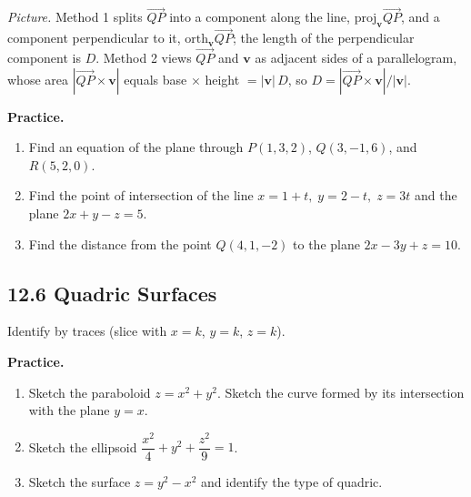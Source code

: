 \documentclass[12pt]{article}
\theoremstyle{compact}
\renewcommand{\vec}[1]{\mathbf{#1}}
\begin{document}
\textit{Picture.} Method 1 splits $\overrightarrow{QP}$ into a component along the line, $\mathrm{proj}_{\vec v}\overrightarrow{QP}$, and a component perpendicular to it, $\mathrm{orth}_{\vec v}\overrightarrow{QP}$; the length of the perpendicular component is $D$.  Method 2 views $\overrightarrow{QP}$ and $\vec v$ as adjacent sides of a parallelogram, whose area $|\overrightarrow{QP}\times\vec v|$ equals base $\times$ height $= |\vec v|\,D$, so $D = |\overrightarrow{QP}\times\vec v|/|\vec v|$.

\medskip\textbf{Practice.}
\begin{enumerate}[noitemsep]
  \item Find an equation of the plane through $P(1,3,2)$, $Q(3,-1,6)$, and $R(5,2,0)$.
  \item Find the point of intersection of the line $x=1+t,\; y=2-t,\; z=3t$ and the plane $2x+y-z=5$.
  \item Find the distance from the point $Q(4,1,-2)$ to the plane $2x-3y+z=10$.
\end{enumerate}

\subsection{12.6 Quadric Surfaces}

Identify by traces (slice with $x=k$, $y=k$, $z=k$).

\medskip\textbf{Practice.}
\begin{enumerate}[noitemsep]
  \item Sketch the paraboloid $z=x^2+y^2$. Sketch the curve formed by its intersection with the plane $y=x$.
  \item Sketch the ellipsoid $\dfrac{x^2}{4}+y^2+\dfrac{z^2}{9}=1$.
  \item Sketch the surface $z=y^2-x^2$ and identify the type of quadric.
\end{enumerate}
\end{document}
